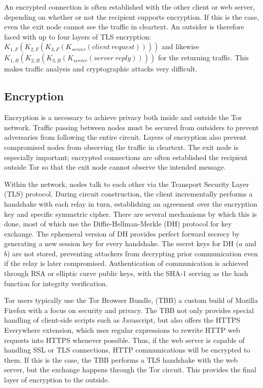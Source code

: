 \documentclass[journal]{IEEEtran}
\begin{document}
An encrypted connection is often established with the other client or web server, depending on whether or not the recipient supports encryption. If this is the case, even the exit node cannot see the traffic in cleartext. An outsider is therefore faced with up to four layers of TLS encryption: $K_{1,F}(K_{2,F}(K_{3,F}(K_{server}(client\ request))))$ and likewise $K_{1,B}(K_{2,B}(K_{3,B}(K_{server}(server\ reply))))$ for the returning traffic. This makes traffic analysis and cryptographic attacks very difficult.

\subsection{Encryption}


Encryption is a necessary to achieve privacy both inside and outside the Tor network. Traffic passing between nodes must be secured from outsiders to prevent adversaries from following the entire circuit. Layers of encryption also prevent compromised nodes from observing the traffic in cleartext. The exit node is especially important; encrypted connections are often established the recipient outside Tor so that the exit node cannot observe the intended message.

Within the network, nodes talk to each other via the Transport Security Layer (TLS) protocol. During circuit construction, the client incrementally performs a handshake with each relay in turn, establishing an agreement over the encryption key and specific symmetric cipher. There are several mechanisms by which this is done, most of which use the Diffie-Hellman-Merkle (DH) protocol for key exchange. The ephemeral version of DH provides perfect forward secrecy by generating a new session key for every handshake. The secret keys for DH ($a$ and $b$) are not stored, preventing attackers from decrypting prior communication even if the relay is later compromised. Authentication of communication is achieved through RSA or elliptic curve public keys, with the SHA-1 serving as the hash function for integrity verification.

Tor users typically use the Tor Browser Bundle, (TBB) a custom build of Mozilla Firefox with a focus on security and privacy. The TBB not only provides special handling of client-side scripts such as Javascript, but also offers the HTTPS Everywhere extension, which uses regular expressions to rewrite HTTP web requests into HTTPS whenever possible. Thus, if the web server is capable of handling SSL or TLS connections, HTTP communications will be encrypted to them. If this is the case, the TBB performs a TLS handshake with the web server, but the exchange happens through the Tor circuit. This provides the final layer of encryption to the outside.
\end{document}
